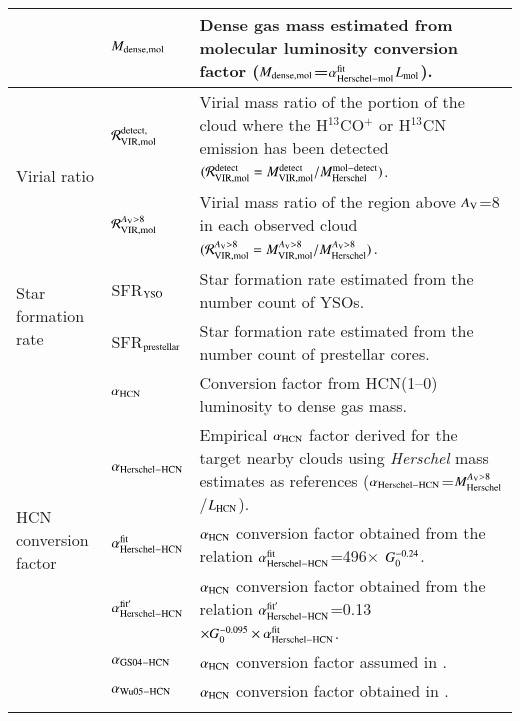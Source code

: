 \begin{table*}
{\begin{threeparttable}
\begin{tabular}{|l|l|l|}
         & $M_{\rm dense,mol}$  & Dense gas mass estimated from molecular luminosity conversion factor ($M_{\rm dense,mol}$=$\alpha_{\rm Herschel-mol}^{\rm fit}$$L_{\rm mol}$). \\
\hline
\multirow{2}{*}{Virial ratio} & $\mathcal{R}_{\rm VIR,mol}^{\rm detect,}$           &  Virial mass ratio of the portion of the cloud where the H$^{13}$CO$^+$ or H$^{13}$CN emission has been detected $(\mathcal{R}_{\rm VIR,mol}^{\rm detect}={M_{\rm VIR,mol}^{\rm detect}}/{M_{\rm Herschel}^{\rm mol-detect}})$. \\
                                         & $\mathcal{R}_{\rm VIR,mol}^{A_{\rm V}>8}$    &  Virial mass ratio of the region above $A_{\rm V}$=8 in each observed cloud $(\mathcal{R}_{\rm VIR,mol}^{A_{\rm V}>8}={M_{\rm VIR,mol}^{A_{\rm V}>8}}/{M_{\rm Herschel}^{A_{\rm V}>8}})$.  \\
\hline
\multirow{2}{*}{Star formation rate}  &  SFR$_{\rm YSO}$       &  Star formation rate estimated from the number count of YSOs. \\
                              &  SFR$_{\rm prestellar}$   & Star formation rate estimated from the number count of prestellar cores.  \\
\hline
\multirow{7}{*}{HCN conversion factor}  & $\alpha_{\rm HCN}$  & Conversion factor from HCN(1--0) luminosity to dense gas mass. \\
& $\alpha_{\rm Herschel-HCN}$  & Empirical $\alpha_{\rm HCN}$  factor derived for the target nearby clouds using {\it Herschel} mass estimates as references ($\alpha_{\rm Herschel-HCN}$=$M_{\rm Herschel}^{A_{\rm V}>8}$/$L_{\rm HCN}$). \\
                             & $\alpha_{\rm Herschel-HCN}^{\rm fit}$  & $\alpha_{\rm HCN}$ conversion factor obtained from the relation $\alpha_{\rm Herschel-HCN}^{\rm fit}$=496$\times$ $G_{\rm 0}^{-0.24}$.   \\
                             & $\alpha_{\rm Herschel-HCN}^{\rm fit ^\prime}$  & $\alpha_{\rm HCN}$ conversion factor obtained from the relation $\alpha_{\rm Herschel-HCN}^{\rm fit^{\prime}}$=0.13$\times G_{\rm 0}^{-0.095} \times \alpha_{\rm Herschel-HCN}^{\rm fit}$.   \\
                             & $\alpha_{\rm GS04-HCN}$  & $\alpha_{\rm HCN}$ conversion factor assumed in \citet{Gao04b}.  \\
                             & $\alpha_{\rm Wu05-HCN}$  & $\alpha_{\rm HCN}$ conversion factor obtained in \citet{Wu05}.  \\
$$
\end{tabular}
\end{threeparttable}}
\end{table*}
